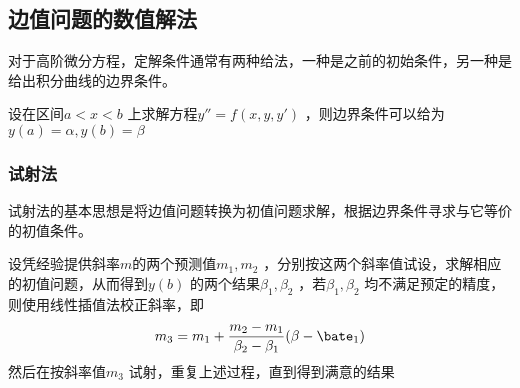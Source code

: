 \documentclass[a4paper]{article}
\begin{document}
\subsection{边值问题的数值解法}
对于高阶微分方程，定解条件通常有两种给法，一种是之前的初始条件，另一种是给出积分曲线的边界条件。

设在区间$a < x < b$ 上求解方程$y''=f(x, y, y')$ ，则边界条件可以给为$y(a) = \alpha, y(b) = \beta$

\subsubsection{试射法}
试射法的基本思想是将边值问题转换为初值问题求解，根据边界条件寻求与它等价的初值条件。

设凭经验提供斜率$m$的两个预测值$m_1, m_2$ ，分别按这两个斜率值试设，求解相应的初值问题，从而得到$y(b)$ 的两个结果$\beta_1, \beta_2$ ，若$\beta_1, \beta_2$ 均不满足预定的精度，则使用线性插值法校正斜率，即
\[
m_3 = m_1 + \frac{m_2 - m_1}{\beta_2 - \beta_1} (\beta - \bate_1)
\] 
然后在按斜率值$m_3$ 试射，重复上述过程，直到得到满意的结果
\end{document}
